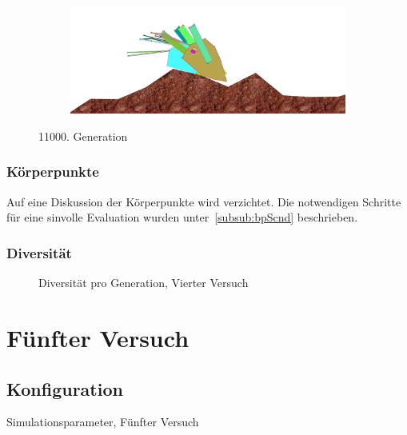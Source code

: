 \begin{figure}[H]
\begin{subfigure}[b]{0.45\textwidth}
                \includegraphics[width=\linewidth,center]{graphics/simulation-results/4_gen11000_4}
                \caption{\label{fig:gen11000_4}}
              \end{subfigure}
              \caption{11000. Generation \label{fig:gen11000}}
            \end{figure}

          \subsubsection{Körperpunkte}

            Auf eine Diskussion der Körperpunkte wird verzichtet.
            Die notwendigen Schritte für eine sinvolle Evaluation wurden unter~\vref{subsub:bpScnd} beschrieben.

          \subsubsection{Diversität}

            \begin{figure}[H]
              \centering
              
              \caption{Diversität pro Generation, Vierter Versuch\label{fig:graphDivFourth}}
            \end{figure}

    \section{Fünfter Versuch}

      \subsection{Konfiguration}

        \begin{table}[H]
          \centering
          
          \caption{Simulationsparameter, Fünfter Versuch}
        \end{table}

